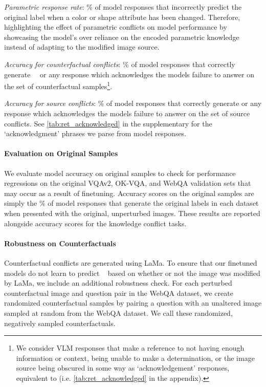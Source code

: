 \textit{Parametric response rate}: \% of model responses that incorrectly predict the original label when a color or shape attribute has been changed. Therefore, highlighting the effect of parametric conflicts on model performance by showcasing the model's over reliance on the encoded parametric knowledge instead of adapting to the modified image source.

\textit{Accuracy for counterfactual conflicts}: \% of model responses that correctly generate \retlabel~~or any response which acknowledges the models failure to answer on the set of counterfactual samples\footnote{We consider VLM responses that make a reference to not having enough information or context, being unable to make a determination, or the image source being obscured in some way as `acknowledgement' responses, equivalent to \retlabel (i.e. \autoref{tab:ret_acknowledged} in the appendix).}.

\textit{Accuracy for source conflicts}: \% of model responses that correctly generate \retlabel or any response which acknowledges the models failure to answer on the set of source conflicts.  See \autoref{tab:ret_acknowledged} in the supplementary for the `acknowledgment' phrases we parse from model responses.


\paragraph{Evaluation on Original Samples}
We evaluate model accuracy on original samples to check for performance regressions on the original VQAv2, OK-VQA, and WebQA validation sets that may occur as a result of finetuning. Accuracy scores on the original samples are simply the \% of model responses that generate the original labels in each dataset when presented with the original, unperturbed images. These results are reported alongside accuracy scores for the knowledge conflict tasks. 


\paragraph{Robustness on Counterfactuals}
Counterfactual conflicts are generated using LaMa. To ensure that our finetuned models do not learn to predict \retlabel~ based on whether or not the image was modified by LaMa, we include an additional robustness check. For each perturbed counterfactual image and question pair in the WebQA dataset, we create randomized counterfactual samples by pairing a question with an unaltered image sampled at random from the WebQA dataset. We call these randomized, negatively sampled counterfactuals.

